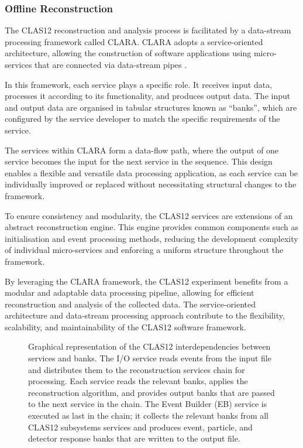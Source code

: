 \subsubsection{Offline Reconstruction}
\label{11.230::offline_reconstruction}
    The CLAS12 reconstruction and analysis process is facilitated by a data-stream processing framework called CLARA.
    CLARA adopts a service-oriented architecture, allowing the construction of software applications using micro-services that are connected via data-stream pipes \cite{gyurgyan2016}.

    In this framework, each service plays a specific role.
    It receives input data, processes it according to its functionality, and produces output data.
    The input and output data are organised in tabular structures known as ``banks'', which are configured by the service developer to match the specific requirements of the service.

    The services within CLARA form a data-flow path, where the output of one service becomes the input for the next service in the sequence.
    This design enables a flexible and versatile data processing application, as each service can be individually improved or replaced without necessitating structural changes to the framework.

    To ensure consistency and modularity, the CLAS12 services are extensions of an abstract reconstruction engine.
    This engine provides common components such as initialisation and event processing methods, reducing the development complexity of individual micro-services and enforcing a uniform structure throughout the framework.

    By leveraging the CLARA framework, the CLAS12 experiment benefits from a modular and adaptable data processing pipeline, allowing for efficient reconstruction and analysis of the collected data.
    The service-oriented architecture and data-stream processing approach contribute to the flexibility, scalability, and maintainability of the CLAS12 software framework.

    \begin{figure}[b!]
        \caption[CLAS12 offline software reconstruction chain]
        {Graphical representation of the CLAS12 interdependencies between services and banks.
        The I/O service reads events from the input file and distributes them to the reconstruction services chain for processing.
        Each service reads the relevant banks, applies the reconstruction algorithm, and provides output banks that are passed to the next service in the chain.
        The Event Builder (EB) service is executed as last in the chain; it collects the relevant banks from all CLAS12 subsystems services and produces event, particle, and detector response banks that are written to the output file.}
        \label{fig::11.230::recon_chain}
    \end{figure}

